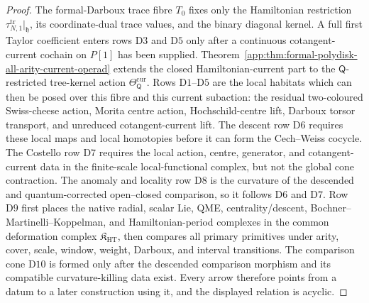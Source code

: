\begin{proof}
The formal-Darboux trace fibre \(T_0\) fixes only the Hamiltonian
restriction \(\tau^{\mathrm{tr}}_{N,1}|_{\mathfrak h}\), its
coordinate-dual trace values, and the binary diagonal kernel.  A full
first Taylor coefficient enters rows \(\mathrm{D3}\) and \(\mathrm{D5}\)
only after a continuous cotangent-current cochain on \(P[1]\) has been
supplied.
Theorem~\ref{app:thm:formal-polydisk-all-arity-current-operad}
extends the closed Hamiltonian-current part to the
\(\mathsf Q\)-restricted tree-kernel action
\(\Theta_{\mathsf Q}^{\mathrm{cur}}\).  Rows
\(\mathrm{D1}\)--\(\mathrm{D5}\) are the local habitats which can then be
posed over this fibre and this current subaction: the residual
two-coloured Swiss-cheese action, Morita centre action, Hochschild-centre
lift, Darboux torsor transport, and unreduced cotangent-current lift.  The
descent row \(\mathrm{D6}\) requires these local maps and local homotopies
before it can form the Cech--Weiss cocycle.  The Costello row
\(\mathrm{D7}\) requires the local action, centre, generator, and
cotangent-current data in the finite-scale local-functional complex, but
not the global cone contraction.  The anomaly and locality row
\(\mathrm{D8}\) is the curvature of the descended and quantum-corrected
open--closed comparison, so it follows \(\mathrm{D6}\) and
  \(\mathrm{D7}\).  Row \(\mathrm{D9}\) first places the native radial,
  scalar Lie, QME, centrality/descent, Bochner--Martinelli--Koppelman, and
  Hamiltonian-period complexes in the common deformation complex
  \(\mathfrak K_{\mathrm{HT}}\), then compares all primary primitives under
  arity, cover, scale, window, weight, Darboux, and interval transitions.
  The comparison cone \(\mathrm{D10}\) is formed
only after the descended comparison morphism and its compatible
curvature-killing data exist.  Every arrow therefore points from a datum
to a later construction using it, and the displayed relation is acyclic.
\end{proof}

